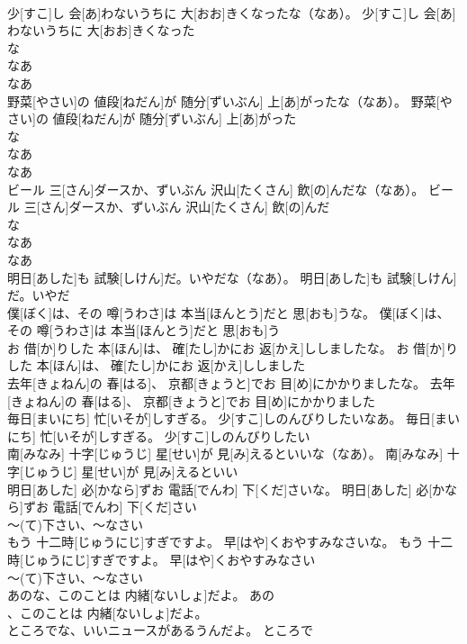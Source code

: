 \documentclass[8pt]{extreport}
\begin{document}
\begin{CJK}{UTF8}{min}
\\	少[すこ]し 会[あ]わないうちに 大[おお]きくなったな（なあ）。	少[すこ]し 会[あ]わないうちに 大[おお]きくなった
\\	な 
\\	なあ 
\\	なあ 
\\	野菜[やさい]の 値段[ねだん]が 随分[ずいぶん] 上[あ]がったな（なあ）。	野菜[やさい]の 値段[ねだん]が 随分[ずいぶん] 上[あ]がった
\\	な 
\\	なあ 
\\	なあ 
\\	ビール 三[さん]ダースか、ずいぶん 沢山[たくさん] 飲[の]んだな（なあ）。	ビール 三[さん]ダースか、ずいぶん 沢山[たくさん] 飲[の]んだ
\\	な 
\\	なあ 
\\	なあ 
\\	明日[あした]も 試験[しけん]だ。いやだな（なあ）。	明日[あした]も 試験[しけん]だ。いやだ
\\	僕[ぼく]は、その 噂[うわさ]は 本当[ほんとう]だと 思[おも]うな。	僕[ぼく]は、その 噂[うわさ]は 本当[ほんとう]だと 思[おも]う
\\	お 借[か]りした 本[ほん]は、 確[たし]かにお 返[かえ]ししましたな。	お 借[か]りした 本[ほん]は、 確[たし]かにお 返[かえ]ししました
\\	去年[きょねん]の 春[はる]、 京都[きょうと]でお 目[め]にかかりましたな。	去年[きょねん]の 春[はる]、 京都[きょうと]でお 目[め]にかかりました
\\	毎日[まいにち] 忙[いそが]しすぎる。 少[すこ]しのんびりしたいなあ。	毎日[まいにち] 忙[いそが]しすぎる。 少[すこ]しのんびりしたい
\\	南[みなみ] 十字[じゅうじ] 星[せい]が 見[み]えるといいな（なあ）。	南[みなみ] 十字[じゅうじ] 星[せい]が 見[み]えるといい
\\	明日[あした] 必[かなら]ずお 電話[でんわ] 下[くだ]さいな。	明日[あした] 必[かなら]ずお 電話[でんわ] 下[くだ]さい
\\	～(て)下さい、～なさい
\\	もう 十二時[じゅうにじ]すぎですよ。 早[はや]くおやすみなさいな。	もう 十二時[じゅうにじ]すぎですよ。 早[はや]くおやすみなさい
\\	～(て)下さい、～なさい
\\	あのな、このことは 内緒[ないしょ]だよ。	あの
\\	、このことは 内緒[ないしょ]だよ。	
\\	ところでな、いいニュースがあるうんだよ。	ところで

\end{CJK}
\end{document}
